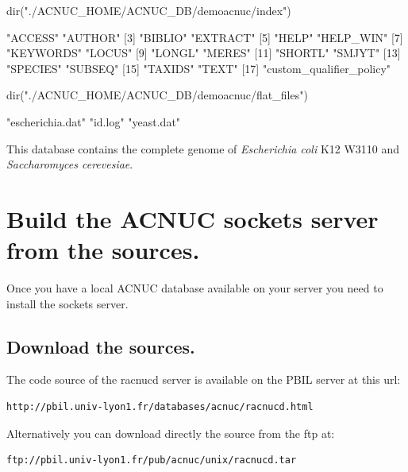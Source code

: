 \documentclass{article}
\begin{document}
\begin{Schunk}
\begin{Sinput}
 dir("./ACNUC_HOME/ACNUC_DB/demoacnuc/index")
\end{Sinput}
\begin{Soutput}
 [1] "ACCESS"                  "AUTHOR"                 
 [3] "BIBLIO"                  "EXTRACT"                
 [5] "HELP"                    "HELP_WIN"               
 [7] "KEYWORDS"                "LOCUS"                  
 [9] "LONGL"                   "MERES"                  
[11] "SHORTL"                  "SMJYT"                  
[13] "SPECIES"                 "SUBSEQ"                 
[15] "TAXIDS"                  "TEXT"                   
[17] "custom_qualifier_policy"
\end{Soutput}
\begin{Sinput}
 dir("./ACNUC_HOME/ACNUC_DB/demoacnuc/flat_files")
\end{Sinput}
\begin{Soutput}
[1] "escherichia.dat" "id.log"          "yeast.dat"      
\end{Soutput}
\end{Schunk}


This database contains the complete genome of \textit{Escherichia coli} 
K12 W3110 and \textit{Saccharomyces cerevesiae}.

\section{Build the ACNUC sockets server from the sources.}

Once you have a local  ACNUC database available on your server you need to install the sockets server.

\subsection{Download the sources.}

The code source of the racnucd server is available on the PBIL server  at this url:
\begin{verbatim}
http://pbil.univ-lyon1.fr/databases/acnuc/racnucd.html
\end{verbatim}
Alternatively you can download directly  the source from the ftp at:
\begin{verbatim}
ftp://pbil.univ-lyon1.fr/pub/acnuc/unix/racnucd.tar
\end{verbatim}
\end{document}
